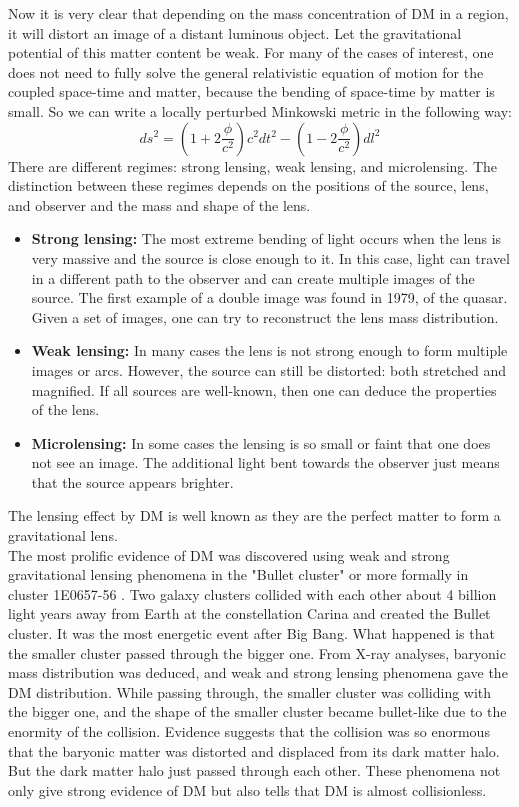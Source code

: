 \documentclass[12pt]{report}
\begin{document}
Now it is very clear that depending on the mass concentration of DM in a region, it will distort an image of a distant luminous object. Let the gravitational potential of this matter content be weak. For many of the cases of interest, one does not need to fully solve the general relativistic equation of motion for the coupled space-time and matter, because the bending of space-time by matter is small. So we can write a locally perturbed Minkowski metric in the following way: $$ds^2=\left(1+2\frac{\phi}{c^2}\right)c^2dt^2-\left(1-2\frac{\phi}{c^2}\right)dl^2$$ \cite{dmtheory1} \cite{dmtheory2}
There are different regimes: strong lensing, weak lensing, and microlensing. The distinction between these regimes depends on the positions of the source, lens, and observer and the mass and shape of the lens. 
\begin{itemize}
\item \textbf{Strong lensing:} The most extreme bending of light occurs when the lens is very massive and the source is close enough to it. In this case, light can travel in a different path to the observer and can create multiple images of the source. The first example of a double image was found in 1979, of the quasar. Given a set of images, one can try to reconstruct the lens mass distribution.


\item \textbf{Weak lensing:} In many cases the lens is not strong enough to form multiple images or arcs. However, the source can still be distorted: both stretched and magnified. If all sources are well-known, then one can deduce the properties of the lens.

\item \textbf{Microlensing:} In some cases the lensing is so small or faint that one does not see an image. The additional light bent towards the observer just means that the source appears brighter.
\end{itemize}

The lensing effect by DM is well known as they are the perfect matter to form a gravitational lens.\\

The most prolific evidence of DM was discovered using weak and strong gravitational lensing phenomena in the "Bullet cluster" or more formally in cluster 1E0657-56 \cite{dmtheory1}. Two galaxy clusters collided with each other about 4 billion light years away from Earth at the constellation Carina and created the Bullet cluster. It was the most energetic event after Big Bang. What happened is that the smaller cluster passed through the bigger one. From X-ray analyses, baryonic mass distribution was deduced, and weak and strong lensing phenomena gave the DM distribution. While passing through, the smaller cluster was colliding with the bigger one, and the shape of the smaller cluster became bullet-like due to the enormity of the collision. Evidence suggests that the collision was so enormous that the baryonic matter was distorted and displaced from its dark matter halo. But the dark matter halo just passed through each other. These phenomena not only give strong evidence of DM but also tells that DM is almost collisionless. \cite{dmtheory1}
\end{document}
